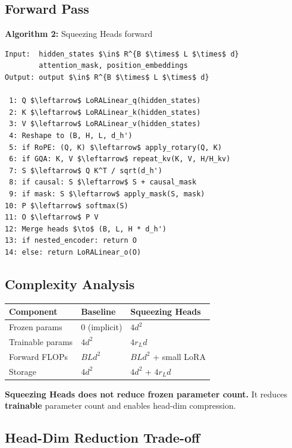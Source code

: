 \subsection{Forward Pass}

\textbf{Algorithm 2:} Squeezing Heads forward
\begin{lstlisting}
Input:  hidden_states $\in$ R^{B $\times$ L $\times$ d}
        attention_mask, position_embeddings
Output: output $\in$ R^{B $\times$ L $\times$ d}

 1: Q $\leftarrow$ LoRALinear_q(hidden_states)
 2: K $\leftarrow$ LoRALinear_k(hidden_states)
 3: V $\leftarrow$ LoRALinear_v(hidden_states)
 4: Reshape to (B, H, L, d_h')
 5: if RoPE: (Q, K) $\leftarrow$ apply_rotary(Q, K)
 6: if GQA: K, V $\leftarrow$ repeat_kv(K, V, H/H_kv)
 7: S $\leftarrow$ Q K^T / sqrt(d_h')
 8: if causal: S $\leftarrow$ S + causal_mask
 9: if mask: S $\leftarrow$ apply_mask(S, mask)
10: P $\leftarrow$ softmax(S)
11: O $\leftarrow$ P V
12: Merge heads $\to$ (B, L, H * d_h')
13: if nested_encoder: return O
14: else: return LoRALinear_o(O)
\end{lstlisting}

\subsection{Complexity Analysis}

\begin{table}[H]
\centering
\small
\begin{tabular}{lll}
\toprule
\textbf{Component} & \textbf{Baseline} & \textbf{Squeezing Heads} \\
\midrule
Frozen params & 0 (implicit) & $4 d^2$ \\
Trainable params & $4 d^2$ & $4 r_L d$ \\
Forward FLOPs & $B L d^2$ & $B L d^2$ + small LoRA \\
Storage & $4 d^2$ & $4 d^2$ + $4 r_L d$ \\
\bottomrule
\end{tabular}
\end{table}

\textbf{Squeezing Heads does not reduce frozen parameter count.} It reduces 
\textbf{trainable} parameter count and enables head-dim compression.

\subsection{Head-Dim Reduction Trade-off}

